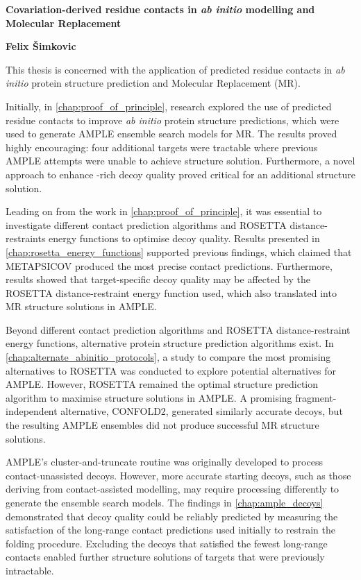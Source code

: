 \singlespacing
\begin{center}
    \Large
    \textbf{Covariation-derived residue contacts in \textit{ab initio} modelling and Molecular Replacement}

    \vspace{0.5cm}
    \large
    \textbf{Felix \v{S}imkovic}
    \vspace{0.5cm}
\end{center}

This thesis is concerned with the application of predicted residue contacts in \textit{ab initio} protein structure prediction and Molecular Replacement (MR).

Initially, in \cref{chap:proof_of_principle}, research explored the use of predicted residue contacts to improve \textit{ab initio} protein structure predictions, which were used to generate AMPLE ensemble search models for MR. The results proved highly encouraging: four additional targets were tractable where previous AMPLE attempts were unable to achieve structure solution. Furthermore, a novel approach to enhance \textbeta-rich decoy quality proved critical for an additional structure solution. 

Leading on from the work in \cref{chap:proof_of_principle}, it was essential to investigate different contact prediction algorithms and ROSETTA distance-restraints energy functions to optimise decoy quality. Results presented in \cref{chap:rosetta_energy_functions} supported previous findings, which claimed that METAPSICOV produced the most precise contact predictions. Furthermore, results showed that target-specific decoy quality may be affected by the ROSETTA distance-restraint energy function used, which also translated into MR structure solutions in AMPLE.

Beyond different contact prediction algorithms and ROSETTA distance-restraint energy functions, alternative protein structure prediction algorithms exist. In \cref{chap:alternate_abinitio_protocols}, a study to compare the most promising alternatives to ROSETTA was conducted to explore potential alternatives for AMPLE. However, ROSETTA remained the optimal structure prediction algorithm to maximise structure solutions in AMPLE. A promising fragment-independent alternative, CONFOLD2, generated similarly accurate decoys, but the resulting AMPLE ensembles did not produce successful MR structure solutions.

AMPLE's cluster-and-truncate routine was originally developed to process contact-unassisted decoys. However, more accurate starting decoys, such as those deriving from contact-assisted modelling, may require processing differently to generate the ensemble search models. The findings in \cref{chap:ample_decoys} demonstrated that decoy quality could be reliably predicted by measuring the satisfaction of the long-range contact predictions used initially to restrain the folding procedure. Excluding the decoys that satisfied the fewest long-range contacts enabled further structure solutions of targets that were previously intractable.

